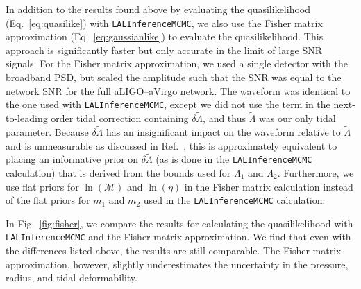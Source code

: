 \documentclass[twocolumn,prd,amssymb,aps,nofootinbib,showpacs,epsf]{revtex4}
\begin{document}
In addition to the results found above by evaluating the quasilikelihood (Eq.~\eqref{eq:quasilike}) with \texttt{LALInferenceMCMC}, we also use the Fisher matrix approximation (Eq.~\eqref{eq:gaussianlike}) to evaluate the quasilikelihood. This approach is significantly faster but only accurate in the limit of large SNR signals. For the Fisher matrix approximation, we used a single detector with the broadband PSD, but scaled the amplitude such that the SNR was equal to the network SNR for the full aLIGO--aVirgo network. The waveform was identical to the one used with \texttt{LALInferenceMCMC}, except we did not use the term in the next-to-leading order tidal correction containing $\delta\tilde\Lambda$, and thus $\tilde\Lambda$ was our only tidal parameter. Because $\delta\tilde\Lambda$ has an insignificant impact on the waveform relative to $\tilde\Lambda$ and is unmeasurable as discussed in Ref.~\cite{WadeCreightonOchsner2014}, this is approximately equivalent to placing an informative prior on $\delta\tilde\Lambda$ (as is done in the \texttt{LALInferenceMCMC} calculation) that is derived from the bounds used for $\Lambda_1$ and $\Lambda_2$. Furthermore, we use flat priors for $\ln(\mathcal{M})$ and $\ln(\eta)$ in the Fisher matrix calculation instead of the flat priors for $m_1$ and $m_2$ used in the \texttt{LALInferenceMCMC} calculation.

In Fig.~\ref{fig:fisher}, we compare the results for calculating the quasilikelihood with \texttt{LALInferenceMCMC} and the Fisher matrix approximation.  We find that even with the differences listed above, the results are still comparable. The Fisher matrix approximation, however, slightly underestimates the uncertainty in the pressure, radius, and tidal deformability.
\end{document}
